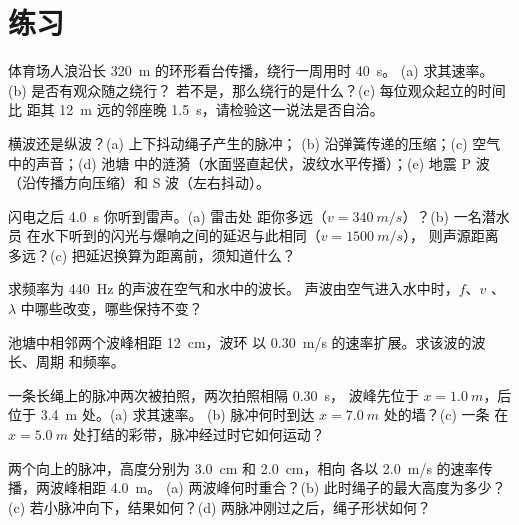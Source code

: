 \section{练习}

\begin{exercise}[$\star$]\label{exo:g12:mechanical-waves:1}
体育场人浪沿长 \qty{320}{m} 的环形看台传播，绕行一周用时 \qty{40}{s}。
(a) 求其速率。(b) 是否有观众随之绕行？
若不是，那么绕行的是什么？(c) 每位观众起立的时间比
距其 \qty{12}{m} 远的邻座晚 \qty{1.5}{s}，请检验这一说法是否自洽。
\end{exercise}

\begin{exercise}[$\star$]\label{exo:g12:mechanical-waves:2}
横波还是纵波？(a) 上下抖动绳子产生的脉冲；
(b) 沿弹簧传递的压缩；(c) 空气中的声音；(d) 池塘
中的涟漪（水面竖直起伏，波纹水平传播）；(e)
地震 P 波（沿传播方向压缩）和 S 波（左右抖动）。
\end{exercise}

\begin{exercise}[$\star$]\label{exo:g12:mechanical-waves:3}
闪电之后 \qty{4.0}{s} 你听到雷声。(a) 雷击处
距你多远（$v = \qty{340}{m/s}$）？(b) 一名潜水员
在水下听到的闪光与爆响之间的延迟与此相同（$v = \qty{1500}{m/s}$），
则声源距离多远？(c) 把延迟换算为距离前，须知道什么？
\end{exercise}

\begin{exercise}[$\star$]\label{exo:g12:mechanical-waves:4}
求频率为 \qty{440}{Hz} 的声波在空气和水中的波长。
声波由空气进入水中时，$f$、$v$
、$\lambda$ 中哪些改变，哪些保持不变？
\end{exercise}

\begin{exercise}[$\star$]\label{exo:g12:mechanical-waves:5}
池塘中相邻两个波峰相距 \qty{12}{cm}，波环
以 \qty{0.30}{m/s} 的速率扩展。求该波的波长、周期
和频率。
\end{exercise}

\begin{exercise}[$\star\star$]\label{exo:g12:mechanical-waves:6}
一条长绳上的脉冲两次被拍照，两次拍照相隔 \qty{0.30}{s}，
波峰先位于 $x = \qty{1.0}{m}$，后位于 \qty{3.4}{m} 处。(a) 求其速率。
(b) 脉冲何时到达 $x = \qty{7.0}{m}$ 处的墙？(c) 一条
在 $x = \qty{5.0}{m}$ 处打结的彩带，脉冲经过时它如何运动？
\end{exercise}

\begin{exercise}[$\star\star$]\label{exo:g12:mechanical-waves:7}
两个向上的脉冲，高度分别为 \qty{3.0}{cm} 和 \qty{2.0}{cm}，相向
各以 \qty{2.0}{m/s} 的速率传播，两波峰相距 \qty{4.0}{m}。
(a) 两波峰何时重合？(b) 此时绳子的最大高度为多少？
(c) 若小脉冲向下，结果如何？(d) 两脉冲刚过之后，绳子形状如何？
\end{exercise}

